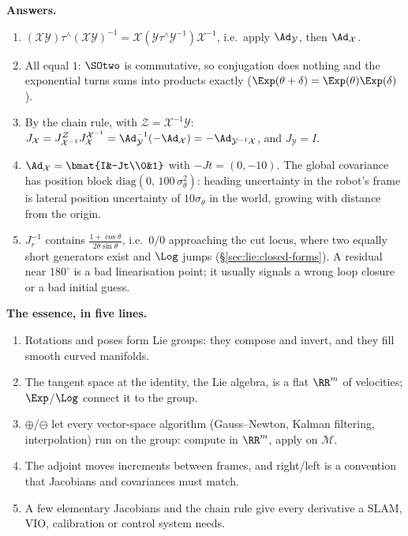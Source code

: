 \textbf{Answers.}
\begin{enumerate}[label=\textbf{P\arabic*.},itemsep=2pt]
\item $(\mathcal X\mathcal Y)\tau^\wedge(\mathcal X\mathcal Y)^{-1}=\mathcal X(\mathcal Y\tau^\wedge\mathcal Y^{-1})\mathcal X^{-1}$, i.e.\ apply $\Ad_{\mathcal Y}$, then $\Ad_{\mathcal X}$.
\item All equal $1$: $\SOtwo$ is commutative, so conjugation does nothing and the exponential turns sums into products exactly ($\Exp(\theta+\delta)=\Exp(\theta)\Exp(\delta)$).
\item By the chain rule, with $\mathcal Z=\mathcal X^{-1}\mathcal Y$: $J_{\mathcal X}=J^{\mathcal Z}_{\mathcal X^{-1}}J^{\mathcal X^{-1}}_{\mathcal X}=\Ad_{\mathcal Y}^{-1}(-\Ad_{\mathcal X})=-\Ad_{\mathcal Y^{-1}\mathcal X}$, and $J_{\mathcal Y}=I$.
\item $\Ad_{\mathcal X}=\bmat{I&-Jt\\0&1}$ with $-Jt=(0,-10)$. The global covariance has position block $\mathrm{diag}(0,\,100\,\sigma_\theta^2)$: heading uncertainty in the robot's frame is lateral position uncertainty of $10\sigma_\theta$ in the world, growing with distance from the origin.
\item $J_r^{-1}$ contains $\frac{1+\cos\theta}{2\theta\sin\theta}$, i.e.\ $0/0$ approaching the cut locus, where two equally short generators exist and $\Log$ jumps (\S\ref{sec:lie:closed-forms}). A residual near $180^\circ$ is a bad linearisation point; it usually signals a wrong loop closure or a bad initial guess.
\end{enumerate}

\textbf{The essence, in five lines.}
\begin{enumerate}[label=\arabic*.,itemsep=1pt]
\item Rotations and poses form Lie groups: they compose and invert, and they fill smooth curved manifolds.
\item The tangent space at the identity, the Lie algebra, is a flat $\RR^m$ of velocities; $\Exp$/$\Log$ connect it to the group.
\item $\oplus$/$\ominus$ let every vector-space algorithm (Gauss--Newton, Kalman filtering, interpolation) run on the group: compute in $\RR^m$, apply on $\mathcal M$.
\item The adjoint moves increments between frames, and right/left is a convention that Jacobians and covariances must match.
\item A few elementary Jacobians and the chain rule give every derivative a SLAM, VIO, calibration or control system needs.
\end{enumerate}

